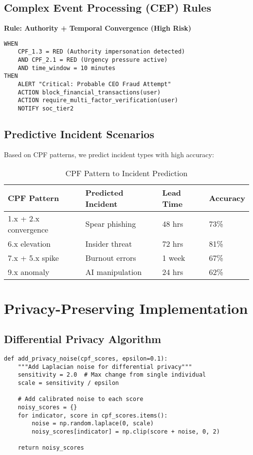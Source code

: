 \documentclass[11pt,a4paper]{article}
\begin{document}
\subsection{Complex Event Processing (CEP) Rules}

\textbf{Rule: Authority + Temporal Convergence (High Risk)}
\begin{verbatim}
WHEN 
    CPF_1.3 = RED (Authority impersonation detected)
    AND CPF_2.1 = RED (Urgency pressure active)
    AND time_window = 10 minutes
THEN 
    ALERT "Critical: Probable CEO Fraud Attempt"
    ACTION block_financial_transactions(user)
    ACTION require_multi_factor_verification(user)
    NOTIFY soc_tier2
\end{verbatim}

\subsection{Predictive Incident Scenarios}

Based on CPF patterns, we predict incident types with high accuracy:

\begin{table}[H]
\centering
\caption{CPF Pattern to Incident Prediction}
\begin{tabular}{p{4cm}p{4cm}p{2cm}p{2cm}}
\toprule
CPF Pattern & Predicted Incident & Lead Time & Accuracy \\
\midrule
1.x + 2.x convergence & Spear phishing & 48 hrs & 73\% \\
6.x elevation & Insider threat & 72 hrs & 81\% \\
7.x + 5.x spike & Burnout errors & 1 week & 67\% \\
9.x anomaly & AI manipulation & 24 hrs & 62\% \\
\bottomrule
\end{tabular}
\end{table}

\section{Privacy-Preserving Implementation}

\subsection{Differential Privacy Algorithm}

\begin{lstlisting}
def add_privacy_noise(cpf_scores, epsilon=0.1):
    """Add Laplacian noise for differential privacy"""
    sensitivity = 2.0  # Max change from single individual
    scale = sensitivity / epsilon
    
    # Add calibrated noise to each score
    noisy_scores = {}
    for indicator, score in cpf_scores.items():
        noise = np.random.laplace(0, scale)
        noisy_scores[indicator] = np.clip(score + noise, 0, 2)
    
    return noisy_scores
\end{lstlisting}
\end{document}
